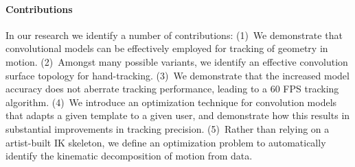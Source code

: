 

\paragraph{Contributions}
In our research we identify a number of contributions:
(1)~We demonstrate that convolutional models can be effectively employed for tracking of geometry in motion. 
(2)~Amongst many possible variants, we identify an effective convolution surface  topology for hand-tracking.  
(3)~We demonstrate that the increased model accuracy does not aberrate tracking performance, leading to a 60 FPS tracking algorithm.
(4)~We introduce an optimization technique for convolution models that adapts a given template to a given user, and demonstrate how this results in substantial improvements in tracking precision.
(5)~Rather than relying on a artist-built IK skeleton, we define an optimization problem to automatically identify the kinematic decomposition of motion from data.


